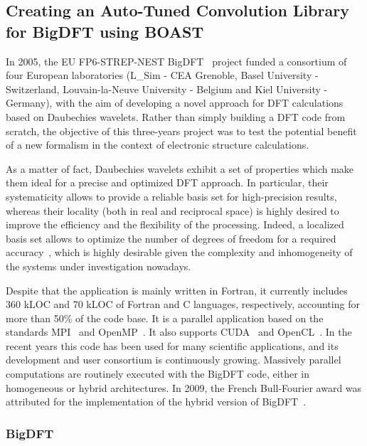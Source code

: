 \documentclass{IEEEtran}
\begin{document}
  \subsection{Creating an Auto-Tuned Convolution Library for BigDFT using
BOAST}

In 2005, the EU FP6-STREP-NEST BigDFT~\cite{genovese2008daubechies} project
funded a consortium of four European laboratories (L\_Sim - CEA Grenoble, Basel
University - Switzerland, Louvain-la-Neuve University - Belgium and Kiel
University - Germany), with the aim of developing a novel approach for DFT
calculations based on Daubechies wavelets.  Rather than simply building a DFT
code from scratch, the objective of this three-years project was to test the
potential benefit of a new formalism in the context of electronic structure
calculations.

As a matter of fact, Daubechies wavelets exhibit a set of properties which make
them ideal for a precise and optimized DFT approach. In particular, their
systematicity allows to provide a reliable basis set for high-precision results,
whereas their locality (both in real and reciprocal space) is highly desired to
improve the efficiency and the flexibility of the processing. Indeed, a
localized basis set allows to optimize the number of degrees of freedom for a
required accuracy~\cite{genovese2008daubechies}, which is highly desirable given
the complexity and inhomogeneity of the systems under investigation nowadays.

Despite that the application is mainly written in Fortran, it currently includes
360 kLOC and 70 kLOC of Fortran and C languages, respectively, accounting for
more than 50\% of the code base.  It is a parallel application based on the
standards MPI~\cite{mpi} and OpenMP~\cite{openmp}.  It also supports
CUDA~\cite{cuda} and OpenCL~\cite{opencl}.  In the recent years this code has
been used for many scientific applications, and its development and user
consortium is continuously growing.  Massively parallel computations are
routinely executed with the BigDFT code, either in homogeneous or hybrid
architectures.  In 2009, the French Bull-Fourier award was attributed for the
implementation of the hybrid version of BigDFT~\cite{genovese2009density}.


    \subsubsection{BigDFT}
\end{document}

